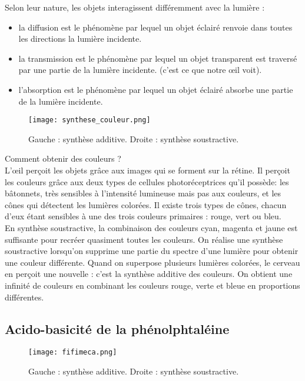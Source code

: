 \documentclass[11pt,a4paper]{report}
\begin{document}
Selon leur nature, les objets interagissent différemment avec la lumière :
\begin{itemize}
	\item la diffusion est le phénomène par lequel un objet éclairé renvoie dans toutes les directions 			la lumière incidente.
	\item la transmission est le phénomène par lequel un objet transparent est traversé par une partie
		de la lumière incidente. (c'est ce que notre œil voit).
	\item l'absorption est le phénomène par lequel un objet éclairé absorbe une partie de la lumière
		incidente.
\end{itemize}

\begin{figure}[h!]
	\begin{center}
  		\texttt{[image: synthese\_couleur.png]}
	\caption{Gauche : synthèse additive. Droite : synthèse soustractive.}
	\end{center}
\end{figure}

Comment obtenir des couleurs ?\\

L'œil perçoit les objets grâce aux images qui se forment sur la rétine. Il perçoit les couleurs grâce
aux deux types de cellules photoréceptrices qu'il possède: les bâtonnets, très sensibles à l'intensité
lumineuse mais pas aux couleurs, et les cônes qui détectent les lumières colorées. Il existe trois types de cônes, chacun d'eux étant sensibles à une des trois couleurs primaires : rouge, vert ou
bleu.\\

En synthèse soustractive, la combinaison des couleurs cyan, magenta et jaune est suffisante pour recréer quasiment toutes les couleurs. On réalise une synthèse soustractive lorsqu'on supprime une partie du spectre d'une lumière pour obtenir une couleur différente. Quand on superpose plusieurs lumières colorées, le cerveau en perçoit une nouvelle : c'est la synthèse additive des couleurs. On obtient une infinité de couleurs en combinant les couleurs rouge, verte et bleue en proportions différentes.

\newpage
\subsection*{Acido-basicité de la phénolphtaléine}

\begin{figure}[h!]
	\begin{center}
  		\texttt{[image: fifimeca.png]}
	\caption{Gauche : synthèse additive. Droite : synthèse soustractive.}
	\end{center}
\end{figure}
\end{document}
